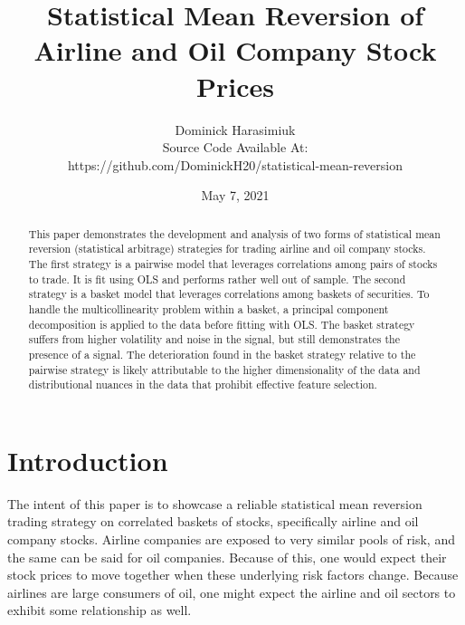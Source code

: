 \documentclass{article}
\title{Statistical Mean Reversion of \\
Airline and Oil Company Stock Prices}
\author{Dominick Harasimiuk\\
Source Code Available At:\\ 
https://github.com/DominickH20/statistical-mean-reversion}
\date{May 7, 2021}
\begin{document}
\maketitle

\vspace{1cm}

\begin{abstract}
\noindent
This paper demonstrates the development and analysis of two forms of statistical
mean reversion (statistical arbitrage) strategies for trading airline and oil company
stocks. The first strategy is a pairwise model that leverages correlations among
pairs of stocks to trade. It is fit using OLS and performs rather well out of sample.
The second strategy is a basket model that leverages correlations among baskets of 
securities. To handle the multicollinearity problem within a basket, a principal component
decomposition is applied to the data before fitting with OLS. The basket strategy suffers 
from higher
volatility and noise in the signal, but still demonstrates the presence of a signal. 
The deterioration found in the basket strategy relative to the pairwise strategy is likely
attributable to the higher dimensionality of the data and distributional nuances in the
data that prohibit effective feature selection. 
\end{abstract}

\newpage
\section{Introduction}
The intent of this paper is to showcase a reliable statistical mean reversion trading strategy
on correlated baskets of stocks, specifically airline and oil company stocks. Airline companies
are exposed to very similar pools of risk, and the same can be said for oil companies. Because
of this, one would expect their stock prices to move together when these underlying risk
factors change. Because airlines are large consumers of oil, one might expect the airline and
oil sectors to exhibit some relationship as well.
\end{document}

